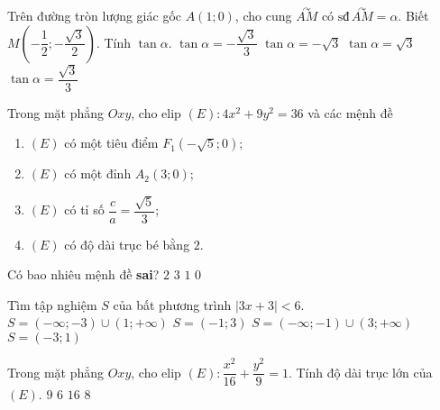 \begin{ex}%
Trên đường tròn lượng giác gốc $A(1;0)$, cho cung $\overset{\curvearrowright}{AM}$ có $\text{sđ}\,\overset{\curvearrowright}{AM}=\alpha$. Biết $M\left( -\dfrac{1}{2};-\dfrac{\sqrt{3}}{2} \right)$. Tính $\tan \alpha$.
\choice
{$\tan\alpha=-\dfrac{\sqrt{3}}{3}$}
{$\tan\alpha=-\sqrt{3}$}
{\True $\tan\alpha=\sqrt{3}$}
{$\tan\alpha=\dfrac{\sqrt{3}}{3}$}
\end{ex}

\begin{ex}%
Trong mặt phẳng $Oxy$, cho elip $(E)\colon 4x^2+9y^2=36$ và các mệnh đề
\begin{enumerate}
\item $(E)$ có một tiêu điểm $F_1\left( -\sqrt{5}; 0 \right)$;
\item $(E)$ có một đỉnh $A_2(3;0)$;
\item $(E)$ có tỉ số $\dfrac{c}{a}=\dfrac{\sqrt{5}}{3}$;
\item $(E)$ có độ dài trục bé bằng $2$.
\end{enumerate}

Có bao nhiêu mệnh đề \textbf{sai}?
\choice
{$2$}
{$3$}
{\True $1$}
{$0$}
\end{ex}

\begin{ex}%
Tìm tập nghiệm $S$ của bất phương trình $\left|3x+3\right|<6$.
\choice
{$S=(-\infty;-3)\cup (1;+\infty)$}
{$S=(-1;3)$}
{$S=(-\infty;-1)\cup (3;+\infty)$}
{\True $S=(-3;1)$}
\end{ex}

\begin{ex}%
Trong mặt phẳng $Oxy$, cho elip $(E)\colon \dfrac{x^2}{16}+\dfrac{y^2}{9}=1$. Tính độ dài trục lớn của $(E)$.
\choice
{$9$}
{$6$}
{$16$}
{\True $8$}
\end{ex}

